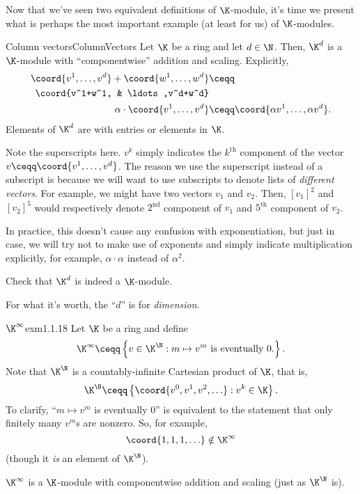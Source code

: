 Now that we've seen two equivalent definitions of $\K$-module, it's time we present what is perhaps the most important example (at least for us) of $\K$-modules.
\begin{exm}{Column vectors}{ColumnVectors}
	Let $\K$ be a ring and let $d\in \N$.  Then, $\K ^d$ is a $\K$-module with ``componentwise'' addition and scaling.  Explicitly,
	\begin{subequations}
		\begin{align}
			\coord{v^1,\ldots ,v^d}+\coord{w^1,\ldots ,w^d} & \ceqq \\
			\coord{v^1+w^1, & \ldots ,v^d+w^d}\notag \\
			\alpha \cdot \coord{v^1,\ldots ,v^d} & \ceqq \coord{\alpha v^1,\ldots ,\alpha v^d}.
		\end{align}
	\end{subequations}
	Elements of $\K ^d$ are  with entries or elements in $\K$.
	\begin{rmk}
		Note the superscripts here.  $v^k$ simply indicates the $k^{\text{th}}$ component of the vector $v\ceqq \coord{v^1,\ldots ,v^d}$.  The reason we use the superscript instead of a subscript is because we will want to use subscripts to denote lists of \emph{different vectors}.  For example, we might have two vectors $v_1$ and $v_2$.  Then, $[v_1]^2$ and $[v_2]^5$ would respectively denote $2^{\text{nd}}$ component of $v_1$ and $5^{\text{th}}$ component of $v_2$.
		
		In practice, this doesn't cause any confusion with exponentiation, but just in case, we will try not to make use of exponents and simply indicate multiplication explicitly, for example, $\alpha \cdot \alpha$ instead of $\alpha ^2$.
	\end{rmk}
	\begin{exr}[breakable=false]{}{}
		Check that $\K ^d$ is indeed a $\K$-module.
	\end{exr}
	\begin{rmk}
		For what it's worth, the ``$d$'' is for \emph{dimension}.
	\end{rmk}
\end{exm}
\begin{exm}{$\K ^{\infty}$}{exm1.1.18}
	Let $\K$ be a ring and define
	\begin{equation}
		\K ^{\infty}\ceqq \left\{ v\in \K ^{\N}:m\mapsto v^m\text{ is eventually }0\text{.}\right\} .
	\end{equation}\index[notation]{$\K ^{\infty}$}
	Note that $\K ^{\N}$ is a countably-infinite Cartesian product of $\K$, that is,
	\begin{equation}
		\K ^{\N}\ceqq \left\{ \coord{v^0,v^1,v^2,\ldots }:v^k\in \K \right\} .
	\end{equation}
	To clarify, ``$m\mapsto v^m$ is eventually $0$'' is equivalent to the statement that only finitely many $v^m$s are nonzero.  So, for example,
	\begin{equation}
		\coord{1,1,1,\ldots }\notin \K ^{\infty}
	\end{equation}
	(though it \emph{is} an element of $\K ^{\N}$).
	
	$\K ^{\infty}$ is a $\K$-module with componentwise addition and scaling (just as $\K ^{\N}$ is).
\end{exm}
